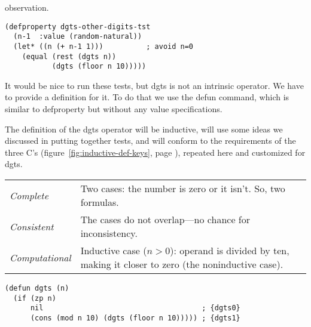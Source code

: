 observation.
\begin{code}
\begin{verbatim}
(defproperty dgts-other-digits-tst
  (n-1  :value (random-natural))
  (let* ((n (+ n-1 1)))          ; avoid n=0
    (equal (rest (dgts n))
           (dgts (floor n 10)))))
\end{verbatim}
\end{code}

It would be nice to run these tests, but
\textsf{dgts} is not an intrinsic operator.
We have to provide a definition for it.
To do that we use the \textsf{defun} command,
which is similar to \textsf{defproperty}
but without any value specifications.

The definition of the \textsf{dgts} operator will be inductive, will
use some ideas we discussed in putting together tests,
and will conform to the requirements of the
three C's
(figure~\ref{fig:inductive-def-keys}, page \pageref{fig:inductive-def-keys}),
repeated here and customized for \textsf{dgts}.
\begin{center}
\begin{tabular}{lp{3.5in}}
\emph{Complete}      & Two cases: the number is zero or it isn't. So, two formulas.\\
\emph{Consistent}    & The cases do not overlap---no chance for inconsistency.\\
\emph{Computational} & Inductive case ($n > 0$): operand is
                       divided by ten, making it closer to zero
                       (the noninductive case).
\end{tabular}
\end{center}

\label{dgts-defun}
\begin{code}
\begin{verbatim}
(defun dgts (n)
  (if (zp n)
      nil                                     ; {dgts0}
      (cons (mod n 10) (dgts (floor n 10))))) ; {dgts1}
\end{verbatim}
\end{code}

